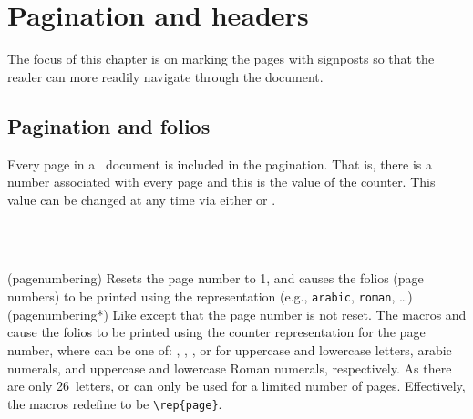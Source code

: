
\chapter{Pagination and headers} \label{chap:pagination}


    The focus of this chapter is on marking the pages 
with signposts so that the reader can more readily navigate through
the document.

\section{Pagination and folios}

    Every page in a \ltx\ document is included in the 
pagination. That is,
there is a number associated with every page and this is the value of
the  counter. This value 
can be changed at any time via either \cmd{\setcounter} or 
\cmd{\addtocounter}.

\begin{syntax}
\cmd{\pagenumbering} \\
\cmd{\pagenumbering*} \\
\end{syntax}
\glossary(pagenumbering)%
  {}%
  {Resets the page number to 1, and causes the folios (page numbers) to be 
   printed using the 
   representation (e.g., \texttt{arabic}, \texttt{roman}, \ldots)}
\glossary(pagenumbering*)%
  {}%
  {Like  except that the page number is not reset.}
The macros \cmd{\pagenumbering} and \cmd{\pagenumbering*} cause 
the folios 
to be printed using the 
counter representation
 for the page number, where  can be one of: 
, , ,  or 
 for uppercase and lowercase letters, arabic numerals, and
uppercase and lowercase Roman numerals, 
respectively. As there
are only 26~letters,  or  can only be
used for a limited number of pages. Effectively, the macros redefine
\cmd{\thepage} to be \verb?\rep{page}?. 

